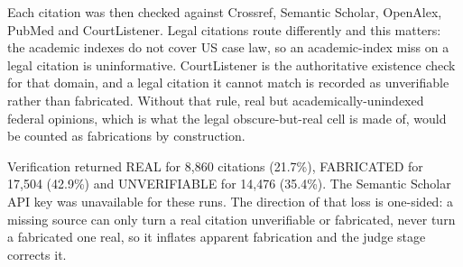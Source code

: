 Each citation was then checked against Crossref, Semantic Scholar, OpenAlex,
PubMed and CourtListener. Legal citations route differently and this matters:
the academic indexes do not cover US case law, so an academic-index miss on a
legal citation is uninformative. CourtListener is the authoritative existence
check for that domain, and a legal citation it cannot match is recorded as
unverifiable rather than fabricated. Without that rule, real but
academically-unindexed federal opinions, which is what the legal
obscure-but-real cell is made of, would be counted as fabrications by
construction.

Verification returned REAL for 8{,}860 citations (21.7\%), FABRICATED for
17{,}504 (42.9\%) and UNVERIFIABLE for 14{,}476 (35.4\%). The Semantic Scholar
API key was unavailable for these runs. The direction of that loss is
one-sided: a missing source can only turn a real citation unverifiable or
fabricated, never turn a fabricated one real, so it inflates apparent
fabrication and the judge stage corrects it.

